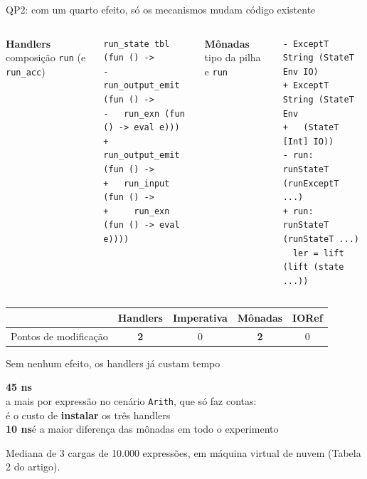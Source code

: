 \documentclass[aspectratio=169,10pt]{beamer}
\newcommand{\oc}[1]{\textcolor{ocamlc}{#1}}
\newcommand{\hs}[1]{\textcolor{haskellc}{#1}}
\begin{document}
\begin{frame}[fragile]{QP2: com um quarto efeito, só os mecanismos mudam código existente}
  \begin{columns}[T]
    \oc{\textbf{Handlers}} \textperiodcentered{} composição \texttt{run} (e \texttt{run\_acc})
\begin{lstlisting}[language=DiffTCC]
  run_state tbl (fun () ->
- run_output_emit (fun () ->
-   run_exn (fun () -> eval e)))
+ run_output_emit (fun () ->
+   run_input (fun () ->
+     run_exn (fun () -> eval e))))
\end{lstlisting}
    \hs{\textbf{Mônadas}} \textperiodcentered{} tipo da pilha e \texttt{run}
\begin{lstlisting}[language=DiffTCC]
- ExceptT String (StateT Env IO)
+ ExceptT String (StateT Env
+   (StateT [Int] IO))
- run: runStateT (runExceptT ...)
+ run: runStateT (runStateT ...)
  ler = lift (lift (state ...))
\end{lstlisting}
  \end{columns}
  \vspace{6pt}
  \begin{center}
  \begin{tabular}{lcccc}
    \toprule
    & \oc{Handlers} & Imperativa & \hs{Mônadas} & IORef \\
    \midrule
    Pontos de modificação & \textbf{2} & 0 & \textbf{2} & 0 \\
    \bottomrule
  \end{tabular}
  \end{center}
\end{frame}

\begin{frame}{Sem nenhum efeito, os handlers já custam tempo}
  \begin{center}
    {\fontsize{60}{64}\selectfont \oc{\textbf{45 ns}}}\\[8pt]
    {\large a mais por expressão no cenário \texttt{Arith}, que só faz contas:}\\[2pt]
    {\large é o custo de \textbf{instalar} os três handlers}\\[18pt]
    {\Large \hs{\textbf{10 ns}}}\quad é a maior diferença das mônadas em todo o experimento
  \end{center}
  \vfill
  {\small\color{neutral} Mediana de 3 cargas de 10.000 expressões, em máquina virtual de nuvem (Tabela 2 do artigo).}
\end{frame}
\end{document}
